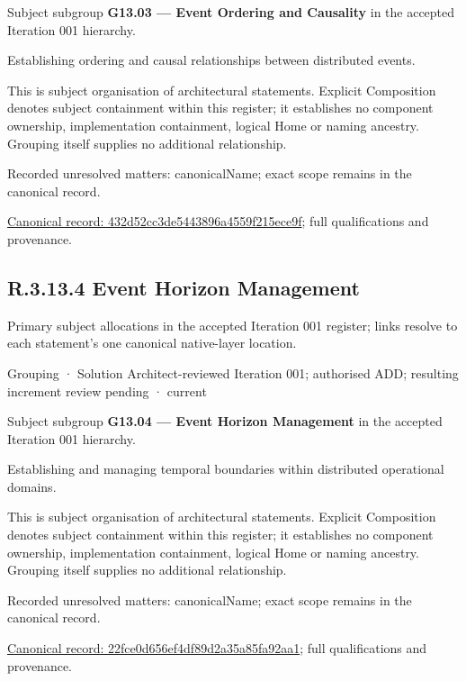 Subject subgroup \textbf{G13.03 — Event Ordering and Causality} in the accepted Iteration 001 hierarchy.



Establishing ordering and causal relationships between distributed events.



This is subject organisation of architectural statements. Explicit Composition denotes subject containment within this register; it establishes no component ownership, implementation containment, logical Home or naming ancestry. Grouping itself supplies no additional relationship.


{\small Recorded unresolved matters: canonicalName; exact scope remains in the canonical record.}\par
{\footnotesize \href{../../../../continuum/grouping/432d52cc3de5443896a4559f215ece9f.md}{Canonical record: 432d52cc3de5443896a4559f215ece9f}; full qualifications and provenance.}\par
\subsection*{R.3.13.4 Event Horizon Management}
\label{navigation:R.3.13.4}

Primary subject allocations in the accepted Iteration 001 register; links resolve to each statement’s one canonical native-layer location.\par
\label{element:22fce0d656ef4df89d2a35a85fa92aa1}
{\small Grouping · Solution Architect-reviewed Iteration 001; authorised ADD; resulting increment review pending · current}\par

Subject subgroup \textbf{G13.04 — Event Horizon Management} in the accepted Iteration 001 hierarchy.



Establishing and managing temporal boundaries within distributed operational domains.



This is subject organisation of architectural statements. Explicit Composition denotes subject containment within this register; it establishes no component ownership, implementation containment, logical Home or naming ancestry. Grouping itself supplies no additional relationship.


{\small Recorded unresolved matters: canonicalName; exact scope remains in the canonical record.}\par
{\footnotesize \href{../../../../continuum/grouping/22fce0d656ef4df89d2a35a85fa92aa1.md}{Canonical record: 22fce0d656ef4df89d2a35a85fa92aa1}; full qualifications and provenance.}\par
